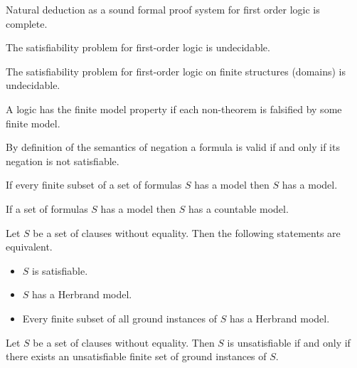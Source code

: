 \begin{theorem}
	Natural deduction as a sound formal proof system for first order logic is complete.
\end{theorem}

\begin{theorem}
	The satisfiability problem for first-order logic is undecidable.
\end{theorem}

\begin{theorem}
	The satisfiability problem for first-order logic on {\myem finite} structures (domains) is undecidable.
\end{theorem}

\begin{definition}
	A logic has the finite model property if each non-theorem is falsified by some finite model.
\end{definition}

\begin{lemma}[Refutation]
	By definition of the semantics of negation a formula is valid if and only if its negation is not satisfiable.
\end{lemma}

\begin{theorem}\label{the:compactness}
	If every finite subset of a set of formulas $S$ has a model then $S$ has a model. 
\end{theorem}

\begin{theorem}\label{the:loewenheim}
	If a set of formulas $S$ has a model then $S$ has a countable model.
\end{theorem}

\begin{theorem}[Herbrand, 1930]\label{the:herbrand}
	Let $S$ be a set of clauses without equality. Then the following statements are equivalent.
	\begin{itemize}
		\item $S$ is satisfiable.
		\item $S$ has a Herbrand model.
		\item Every finite subset of all ground instances of $S$ has a Herbrand model.
	\end{itemize} 
\end{theorem}

\begin{corollary}
	Let $S$ be a set of clauses without equality. 
	Then $S$ is unsatisfiable if and only if there exists 
	an unsatisfiable finite set of ground instances of $S$.
\end{corollary}


